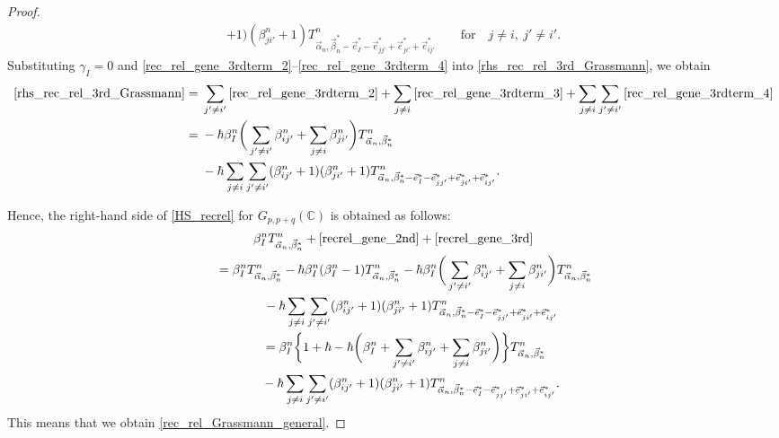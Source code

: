 \documentclass[pdftex]{sigma}
\numberwithin{equation}{section}
\begin{document}
\begin{proof}
\begin{gather}
 +
 1
 )
 (
 \beta_{ji'}^{n}
 +
 1
 )
 T^{n}_{\vec{\alpha}_{n},\vec{\beta}_{n}^{\ast}-\vec{e}_{I}^{\ast}-\vec{e}_{jj'}^{\ast}+\vec{e}_{ji'}^{\ast}+\vec{e}_{ij'}^{\ast}}
 \qquad
 \textrm{for}
\quad
 j
 \neq
 i,
\
 j'
 \neq
 i'
 .
 \label{rec_rel_gene_3rdterm_4}
\end{gather}
Substituting $\gamma_{I}=0$ and \eqref{rec_rel_gene_3rdterm_2}--\eqref{rec_rel_gene_3rdterm_4} into \eqref{rhs_rec_rel_3rd_Grassmann}, we obtain
\begin{align}
 \eqref{rhs_rec_rel_3rd_Grassmann}
={}&
 \sum_{
 j'
 \neq
 i'
 }
 \eqref{rec_rel_gene_3rdterm_2}
 +
 \sum_{
 j
 \neq
 i
 }
 \eqref{rec_rel_gene_3rdterm_3}
 +
 \sum_{
 j
 \neq
 i
 }
 \sum_{
 j'
 \neq
 i'
 }
 \eqref{rec_rel_gene_3rdterm_4}
 \nonumber
 \\
={}&
 -
 \hbar
 \beta_{I}^{n}
 \bigg(
 \sum_{
 j'
 \neq
 i'
 }
 \beta_{ij'}^{n}
 +
 \sum_{
 j
 \neq
 i
 }
 \beta_{ji'}^{n}
 \bigg)
 T^{n}_{\vec{\alpha}_{n},\vec{\beta}_{n}^{\ast}}\nonumber\\
 &
 -
 \hbar
 \sum_{
 j
 \neq
 i
 }
 \sum_{
 j'
 \neq
 i'
 }
 (
 \beta_{ij'}^{n}
 +
 1
 )
 (
 \beta_{ji'}^{n}
 +
 1
 )
 T^{n}_{\vec{\alpha}_{n},\vec{\beta}_{n}^{\ast}-\vec{e}_{I}^{\ast}-\vec{e}_{jj'}^{\ast}+\vec{e}_{ji'}^{\ast}+\vec{e}_{ij'}^{\ast}}.
 \label{recrel_gene_3rd}
\end{align}

Hence, the right-hand side of \eqref{HS_recrel} for $G_{p,p+q}(\mathbb{C})$ is obtained as follows:
\begin{gather}
 \beta_{I}^{n}
 T^{n}_{\vec{\alpha}_{n},\vec{\beta}_{n}^{\ast}}
 +
 \eqref{recrel_gene_2nd}
 +
 \eqref{recrel_gene_3rd}\nonumber\\
 \qquad
 =
 \beta_{I}^{n}
 T^{n}_{\vec{\alpha}_{n},\vec{\beta}_{n}^{\ast}}
 -
 \hbar
 \beta_{I}^{n}
 (
 \beta_{I}^{n}
 -
 1
 )
 T^{n}_{\vec{\alpha}_{n},\vec{\beta}_{n}^{\ast}}
 -
 \hbar
 \beta_{I}^{n}
 \bigg(
 \sum_{
 j'
 \neq
 i'
 }
 \beta_{ij'}^{n}
 +
 \sum_{
 j
 \neq
 i
 }
 \beta_{ji'}^{n}
 \bigg)
 T^{n}_{\vec{\alpha}_{n},\vec{\beta}_{n}^{\ast}}
 \nonumber
 \\
\phantom{\qquad
 =}{}
 -
 \hbar
 \sum_{
 j
 \neq
 i
 }
 \sum_{
 j'
 \neq
 i'
 }
 (
 \beta_{ij'}^{n}
 +
 1
 )
 (
 \beta_{ji'}^{n}
 +
 1
 )
 T^{n}_{\vec{\alpha}_{n},\vec{\beta}_{n}^{\ast}-\vec{e}_{I}^{\ast}-\vec{e}_{jj'}^{\ast}+\vec{e}_{ji'}^{\ast}
 +\vec{e}_{ij'}^{\ast}}
 \nonumber
 \\
\qquad
 =
 \beta_{I}^{n}
 \bigg\{
 1
 +
 \hbar
 -
 \hbar
 \bigg(
 \beta_{I}^{n}
 +
 \sum_{
 j'
 \neq
 i'
 }
 \beta_{ij'}^{n}
 +
 \sum_{
 j
 \neq
 i
 }
 \beta_{ji'}^{n}
 \bigg)
 \bigg\}
 T^{n}_{\vec{\alpha}_{n},\vec{\beta}_{n}^{\ast}}
 \nonumber
 \\
 \phantom{\qquad
 =}{}
 -
 \hbar
 \sum_{
 j
 \neq
 i
 }
 \sum_{
 j'
 \neq
 i'
 }
 (
 \beta_{ij'}^{n}
 +
 1
 )
 (
 \beta_{ji'}^{n}
 +
 1
 )
 T^{n}_{\vec{\alpha}_{n},\vec{\beta}_{n}^{\ast}-\vec{e}_{I}^{\ast}-\vec{e}_{jj'}^{\ast}+\vec{e}_{ji'}^{\ast}+\vec{e}_{ij'}^{\ast}}.
 \label{recrel_gene_right_mid}
\end{gather}
This means that we obtain \eqref{rec_rel_Grassmann_general}.%
\end{proof}
\end{document}
